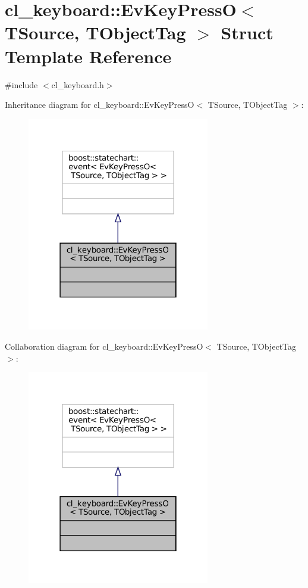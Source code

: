 \hypertarget{structcl__keyboard_1_1EvKeyPressO}{}\section{cl\+\_\+keyboard\+:\+:Ev\+Key\+PressO$<$ T\+Source, T\+Object\+Tag $>$ Struct Template Reference}
\label{structcl__keyboard_1_1EvKeyPressO}


{\ttfamily \#include $<$cl\+\_\+keyboard.\+h$>$}



Inheritance diagram for cl\+\_\+keyboard\+:\+:Ev\+Key\+PressO$<$ T\+Source, T\+Object\+Tag $>$\+:
\nopagebreak
\begin{figure}[H]
\begin{center}
\leavevmode
\includegraphics[width=226pt]{structcl__keyboard_1_1EvKeyPressO__inherit__graph}
\end{center}
\end{figure}


Collaboration diagram for cl\+\_\+keyboard\+:\+:Ev\+Key\+PressO$<$ T\+Source, T\+Object\+Tag $>$\+:
\nopagebreak
\begin{figure}[H]
\begin{center}
\leavevmode
\includegraphics[width=226pt]{structcl__keyboard_1_1EvKeyPressO__coll__graph}
\end{center}
\end{figure}



